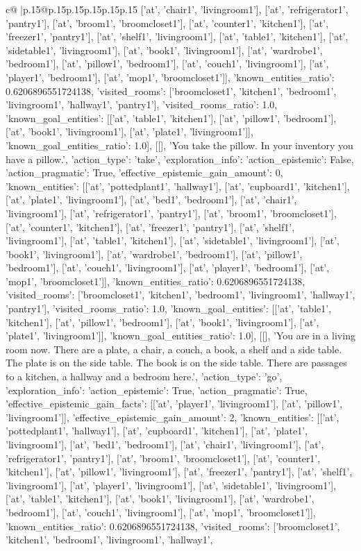 \documentclass{article}
\begin{document}
{\begin{supertabular}{c@{$\;$}|p{.15\linewidth}@{}p{.15\linewidth}p{.15\linewidth}p{.15\linewidth}p{.15\linewidth}p{.15\linewidth}}
{{{['at', 'chair1', 'livingroom1'], ['at', 'refrigerator1', 'pantry1'], ['at', 'broom1', 'broomcloset1'], ['at', 'counter1', 'kitchen1'], ['at', 'freezer1', 'pantry1'], ['at', 'shelf1', 'livingroom1'], ['at', 'table1', 'kitchen1'], ['at', 'sidetable1', 'livingroom1'], ['at', 'book1', 'livingroom1'], ['at', 'wardrobe1', 'bedroom1'], ['at', 'pillow1', 'bedroom1'], ['at', 'couch1', 'livingroom1'], ['at', 'player1', 'bedroom1'], ['at', 'mop1', 'broomcloset1']], 'known_entities_ratio': 0.6206896551724138, 'visited_rooms': ['broomcloset1', 'kitchen1', 'bedroom1', 'livingroom1', 'hallway1', 'pantry1'], 'visited_rooms_ratio': 1.0, 'known_goal_entities': [['at', 'table1', 'kitchen1'], ['at', 'pillow1', 'bedroom1'], ['at', 'book1', 'livingroom1'], ['at', 'plate1', 'livingroom1']], 'known_goal_entities_ratio': 1.0}}], [[], 'You take the pillow. In your inventory you have a pillow.', {'action_type': 'take', 'exploration_info': {'action_epistemic': False, 'action_pragmatic': True, 'effective_epistemic_gain_amount': 0, 'known_entities': [['at', 'pottedplant1', 'hallway1'], ['at', 'cupboard1', 'kitchen1'], ['at', 'plate1', 'livingroom1'], ['at', 'bed1', 'bedroom1'], ['at', 'chair1', 'livingroom1'], ['at', 'refrigerator1', 'pantry1'], ['at', 'broom1', 'broomcloset1'], ['at', 'counter1', 'kitchen1'], ['at', 'freezer1', 'pantry1'], ['at', 'shelf1', 'livingroom1'], ['at', 'table1', 'kitchen1'], ['at', 'sidetable1', 'livingroom1'], ['at', 'book1', 'livingroom1'], ['at', 'wardrobe1', 'bedroom1'], ['at', 'pillow1', 'bedroom1'], ['at', 'couch1', 'livingroom1'], ['at', 'player1', 'bedroom1'], ['at', 'mop1', 'broomcloset1']], 'known_entities_ratio': 0.6206896551724138, 'visited_rooms': ['broomcloset1', 'kitchen1', 'bedroom1', 'livingroom1', 'hallway1', 'pantry1'], 'visited_rooms_ratio': 1.0, 'known_goal_entities': [['at', 'table1', 'kitchen1'], ['at', 'pillow1', 'bedroom1'], ['at', 'book1', 'livingroom1'], ['at', 'plate1', 'livingroom1']], 'known_goal_entities_ratio': 1.0}}], [[], 'You are in a living room now. There are a plate, a chair, a couch, a book, a shelf and a side table. The plate is on the side table. The book is on the side table. There are passages to a kitchen, a hallway and a bedroom here.', {'action_type': 'go', 'exploration_info': {'action_epistemic': True, 'action_pragmatic': True, 'effective_epistemic_gain_facts': [['at', 'player1', 'livingroom1'], ['at', 'pillow1', 'livingroom1']], 'effective_epistemic_gain_amount': 2, 'known_entities': [['at', 'pottedplant1', 'hallway1'], ['at', 'cupboard1', 'kitchen1'], ['at', 'plate1', 'livingroom1'], ['at', 'bed1', 'bedroom1'], ['at', 'chair1', 'livingroom1'], ['at', 'refrigerator1', 'pantry1'], ['at', 'broom1', 'broomcloset1'], ['at', 'counter1', 'kitchen1'], ['at', 'pillow1', 'livingroom1'], ['at', 'freezer1', 'pantry1'], ['at', 'shelf1', 'livingroom1'], ['at', 'player1', 'livingroom1'], ['at', 'sidetable1', 'livingroom1'], ['at', 'table1', 'kitchen1'], ['at', 'book1', 'livingroom1'], ['at', 'wardrobe1', 'bedroom1'], ['at', 'couch1', 'livingroom1'], ['at', 'mop1', 'broomcloset1']], 'known_entities_ratio': 0.6206896551724138, 'visited_rooms': ['broomcloset1', 'kitchen1', 'bedroom1', 'livingroom1', 'hallway1', }}}
\end{supertabular}}
\end{document}
